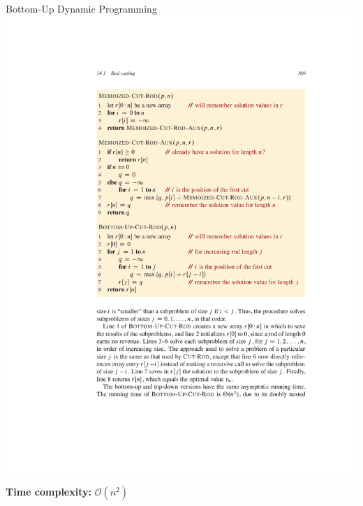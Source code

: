 \documentclass[aspectratio=169]{beamer}
\begin{document}
\begin{frame}{Bottom-Up Dynamic Programming}
    \centering
    \includegraphics[width=\textwidth,clip=true,trim=5cm 10.5cm 3cm 12.5cm]{figures/p369}

    \textbf{Time complexity:} $\mathcal{O}(n^2)$
\end{frame}
\end{document}
